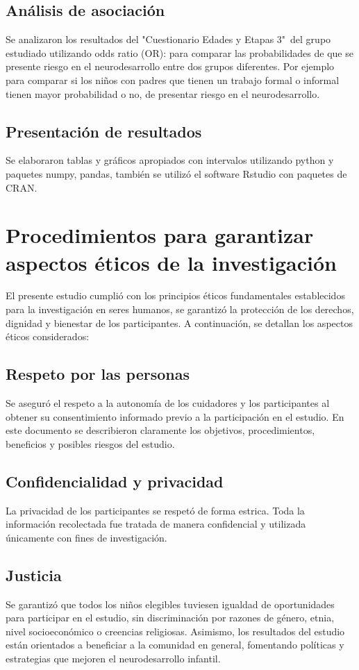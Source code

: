 \documentclass[11pt,letterpaper]{report}
\newcommand{\asq}{"Cuestionario Edades y Etapas 3"}
\begin{document}
\subsection{Análisis de asociación}
Se analizaron los resultados del \asq\ del grupo estudiado utilizando odds
ratio (OR): para comparar las probabilidades de que se presente riesgo en el
neurodesarrollo entre dos grupos diferentes. Por ejemplo para comparar si los
niños con padres que tienen un trabajo formal o informal tienen mayor
probabilidad o no, de presentar riesgo en el neurodesarrollo.

\subsection{Presentación de resultados}
Se elaboraron tablas y gráficos apropiados con intervalos utilizando
python y paquetes numpy, pandas, también se utilizó el software
Rstudio con paquetes de CRAN.

\section{Procedimientos para garantizar aspectos éticos de la investigación}
El presente estudio cumplió con los principios éticos fundamentales establecidos
para la investigación en seres humanos, se garantizó la protección de los
derechos, dignidad y bienestar de los participantes. A continuación, se
detallan los aspectos éticos considerados:

\subsection{Respeto por las personas}
Se aseguró el respeto a la autonomía de los cuidadores y los participantes al
obtener su consentimiento informado previo a la participación en el estudio.
En este documento se describieron claramente los objetivos, procedimientos,
beneficios y posibles riesgos del estudio.

\subsection{Confidencialidad y privacidad}
La privacidad de los participantes se respetó de forma estrica. Toda la
información recolectada fue tratada de manera confidencial y utilizada
únicamente con fines de investigación.

\subsection{Justicia}
Se garantizó que todos los niños elegibles tuviesen igualdad de oportunidades
para participar en el estudio, sin discriminación por razones de género, etnia,
nivel socioeconómico o creencias religiosas. Asimismo, los resultados del
estudio están orientados a beneficiar a la comunidad en general, fomentando
políticas y estrategias que mejoren el neurodesarrollo infantil.
\end{document}
